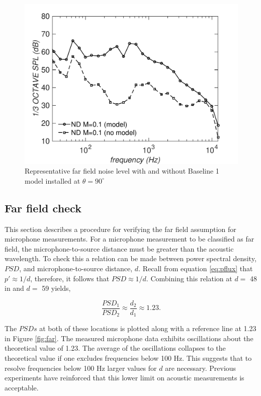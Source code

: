 \begin{figure}
	\begin{center}
		\centerline{\includegraphics[scale=0.7]{figures/mic_empty}}
		\caption{Representative far field noise level with and without Baseline 1 model installed at $\theta = 90^\circ$}
		\label{fig:empty}
	\end{center}
\end{figure}

\subsection{Far field check}
This section describes a procedure for verifying the far field assumption for microphone measurements.
For a microphone measurement to be classified as far field, the microphone-to-source distance must be greater than the acoustic wavelength. To check this a relation can be made between power spectral density, $PSD$, and microphone-to-source distance, $d$. Recall from equation \ref{eq:pflux} that $p' \approx 1/d$, therefore, it follows that $PSD \approx 1/d$. Combining this relation at $d =$ 48 in and $d =$ 59 yields,

\begin{equation}
\frac{PSD_1}{PSD_2} \approx \frac{d_2}{d_1} \approx 1.23.
\end{equation}

The $PSDs$ at both of these locations is plotted along with a reference line at 1.23 in Figure \ref{fig:far}. The measured microphone data exhibits oscillations about the theoretical value of 1.23. The average of the oscillations collapses to the theoretical value if one excludes frequencies below 100 Hz. This suggests that to resolve frequencies below 100 Hz larger values for $d$ are necessary. Previous experiments have reinforced that this lower limit on acoustic measurements is acceptable.
 
